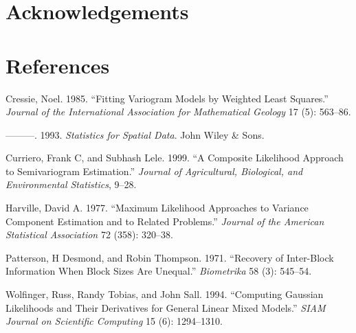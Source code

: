 \documentclass{article}
\begin{document}
\hypertarget{acknowledgements}{%
\section*{Acknowledgements}\label{acknowledgements}}

\hypertarget{references}{%
\section*{References}\label{references}}

\hypertarget{refs}{}
\leavevmode\hypertarget{ref-cressie1985fitting}{}%
Cressie, Noel. 1985. ``Fitting Variogram Models by Weighted Least
Squares.'' \emph{Journal of the International Association for
Mathematical Geology} 17 (5): 563--86.

\leavevmode\hypertarget{ref-cressie1993statistics}{}%
---------. 1993. \emph{Statistics for Spatial Data}. John Wiley \& Sons.

\leavevmode\hypertarget{ref-curriero1999composite}{}%
Curriero, Frank C, and Subhash Lele. 1999. ``A Composite Likelihood
Approach to Semivariogram Estimation.'' \emph{Journal of Agricultural,
Biological, and Environmental Statistics}, 9--28.

\leavevmode\hypertarget{ref-harville1977maximum}{}%
Harville, David A. 1977. ``Maximum Likelihood Approaches to Variance
Component Estimation and to Related Problems.'' \emph{Journal of the
American Statistical Association} 72 (358): 320--38.

\leavevmode\hypertarget{ref-patterson1971recovery}{}%
Patterson, H Desmond, and Robin Thompson. 1971. ``Recovery of
Inter-Block Information When Block Sizes Are Unequal.''
\emph{Biometrika} 58 (3): 545--54.

\leavevmode\hypertarget{ref-wolfinger1994computing}{}%
Wolfinger, Russ, Randy Tobias, and John Sall. 1994. ``Computing Gaussian
Likelihoods and Their Derivatives for General Linear Mixed Models.''
\emph{SIAM Journal on Scientific Computing} 15 (6): 1294--1310.



\end{document}
